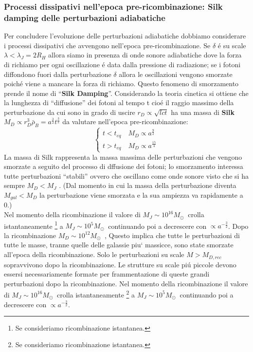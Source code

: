 \documentclass[12pt, a4paper]{article}
\begin{document}
\subsubsection{Processi dissipativi nell'epoca pre-ricombinazione: Silk damping delle perturbazioni adiabatiche}
Per concludere l'evoluzione delle perturbazioni adiabatiche dobbiamo considerare i processi dissipativi che avvengono nell’epoca pre-ricombinazione. Se $\delta$ \'{e} su scale $\lambda<\lambda_J=2 R_H$ allora siamo in presenza di onde sonore adiabatiche dove la forza di richiamo per ogni oscillazione \'{e} data dalla pressione di radiazione; se i fotoni diffondono fuori dalla perturbazione $\delta$ allora le oscillazioni vengono smorzate poich\'{e} viene a mancare la forza di richiamo. Questo fenomeno di smorzamento prende il nome di “\textbf{Silk Damping}”. Considerando la teoria cinetica si ottiene che la lunghezza di “diffusione” dei fotoni al tempo t cio\'{e} il raggio massimo della perturbazione da cui sono in grado di uscire $r_D\propto \sqrt{lct}$ ha una massa di \textbf{Silk} $M_D\propto r_D^3\bar{\rho}_B= a^{\frac{3}{2}} t^{\frac{3}{2}}$ da valutare nell’epoca pre-ricombinazione:
\begin{equation}
\begin{cases}
t<t_{eq} \quad M_D\propto a^{\frac{9}{2}}
\\
t>t_{eq} \quad M_D \propto a^{\frac{15}{4}}
\end{cases}
\end{equation}
La massa di Silk rappresenta la massa massima delle perturbazioni che vengono smorzate a seguito del processo di dffusione dei fotoni;  lo smorzamento interessa tutte perturbazioni “stabili” ovvero che oscillano come onde sonore visto che si ha sempre $M_D<M_J$ . (Dal momento in cui la massa della perturbazione diventa $M_{gal} < M_D$ la perturbazione viene smorzata e la sua ampiezza va rapidamente a 0.)\\
Nel momento della ricombinazione il valore di $M_J\sim 10^{16} M_\odot\ $ crolla istantaneamente \footnote{Se consideriamo ricombinazione istantanea.} a $M_J\sim10^{5} M_\odot\ $ continuando poi a decrescere con $ \propto a^{-\frac{3}{2}}$. Dopo la ricombinazione $M_D\sim 10^{12} M_\odot\ $ , Questo implica che tutte le perturbazioni di tutte le masse, tranne quelle delle galassie piu` massicce, sono state smorzate all'epoca della ricombinazione. Solo le perturbazioni su scale $M>M_{D,rec}$ sopravvivono dopo la ricombinazione. Le strutture su scale pi\'{u} piccole devono essersi necessariamente formate per frammentazione di queste grandi perturbazioni dopo la ricombinazione.
Nel momento della ricombinazione il valore di $M_J\sim 10^{16} M_\odot\ $ crolla istantaneamente \footnote{Se consideriamo ricombinazione istantanea.} a $M_J\sim10^{5} M_\odot\ $ continuando poi a decrescere con $ \propto a^{-\frac{3}{2}}$.
\end{document}
